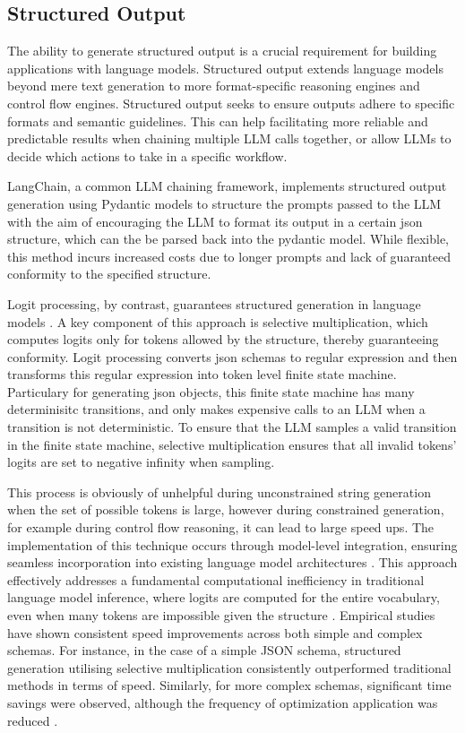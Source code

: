 \documentclass[a4paper, oneside]{discothesis}
\begin{document}
\subsection{Structured Output}
The ability to generate structured output is a crucial requirement for building applications with language models. Structured output extends language models beyond mere text generation to more format-specific reasoning engines and control flow engines. Structured output seeks to ensure outputs adhere to specific formats and semantic guidelines. This can help facilitating more reliable and predictable results when chaining multiple LLM calls together,  or allow LLMs to decide which actions to take in a specific workflow.

LangChain, a common LLM chaining framework, implements structured output generation using Pydantic models to structure the prompts passed to the LLM with the aim of encouraging the LLM to format its output in a certain json structure, which can the be parsed back into the pydantic model. While flexible, this method incurs increased costs due to longer prompts and lack of guaranteed conformity to the specified structure.

Logit processing, by contrast, guarantees structured generation in language models \cite{chaudhari2023logit}. A key component of this approach is selective multiplication, which computes logits only for tokens allowed by the structure, thereby guaranteeing conformity. Logit processing converts json schemas to regular expression and then transforms this regular expression into token level finite state machine. Particulary for generating json objects, this finite state machine has many determinisitc transitions, and only makes expensive calls to an LLM when a transition is not deterministic. To ensure that the LLM samples a valid transition in the finite state machine, selective multiplication ensures that all invalid tokens' logits are set to negative infinity when sampling.

This process is obviously of unhelpful during unconstrained string generation when the set of possible tokens is large, however during constrained generation, for example during control flow reasoning, it can lead to large speed ups. The implementation of this technique occurs through model-level integration, ensuring seamless incorporation into existing language model architectures \cite{chaudhari2023logit}. This approach effectively addresses a fundamental computational inefficiency in traditional language model inference, where logits are computed for the entire vocabulary, even when many tokens are impossible given the structure \cite{willard2023efficient}. Empirical studies have shown consistent speed improvements across both simple and complex schemas. For instance, in the case of a simple JSON schema, structured generation utilising selective multiplication consistently outperformed traditional methods in terms of speed. Similarly, for more complex schemas, significant time savings were observed, although the frequency of optimization application was reduced \cite{chaudhari2023logit}.
\end{document}
